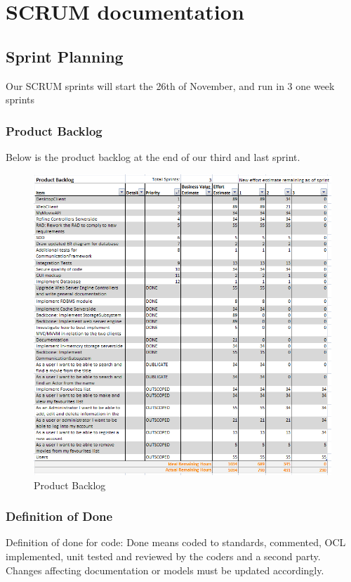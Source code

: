 \chapter{SCRUM documentation}

\section{Sprint Planning}

Our SCRUM sprints will start the 26th of November, and run in 3 one week sprints


\subsection{Product Backlog}
\label{sec:Product Backlog}
Below is the product backlog at the end of our third and last sprint.

\begin{figure}[H]
\includegraphics[scale=0.75]{img/SCRUM/productBacklog.PNG}
\caption{Product Backlog}
\label{fig:Product Backlog}
\end{figure}


\subsection{Definition of Done}
\label{sec:Definition of Done}
Definition of done for code:
Done means coded to standards, commented, OCL implemented, unit tested and reviewed by the coders and a second party. Changes affecting documentation or models must be updated accordingly. \\


